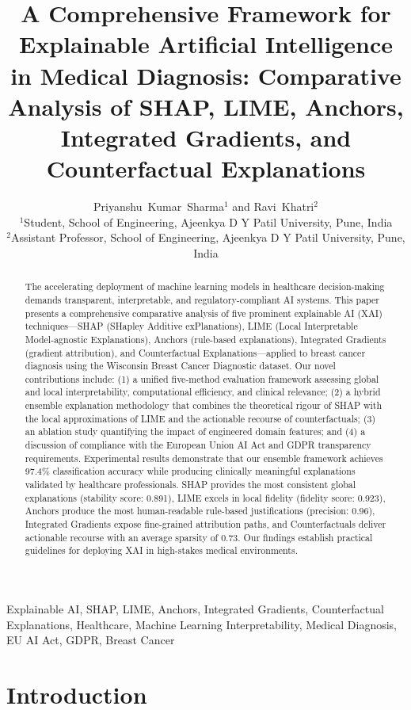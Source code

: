 \documentclass[journal]{IEEEtran}
\title{A Comprehensive Framework for Explainable Artificial Intelligence in Medical Diagnosis: Comparative Analysis of SHAP, LIME, Anchors, Integrated Gradients, and Counterfactual Explanations}
\author{Priyanshu~Kumar~Sharma$^{1}$ and Ravi~Khatri$^{2}$\\
\small $^{1}$Student, School of Engineering, Ajeenkya D Y Patil University, Pune, India\\
\small $^{2}$Assistant Professor, School of Engineering, Ajeenkya D Y Patil University, Pune, India}
\begin{document}
\maketitle

\begin{abstract}
The accelerating deployment of machine learning models in healthcare decision-making demands transparent, interpretable, and regulatory-compliant AI systems. This paper presents a comprehensive comparative analysis of five prominent explainable AI (XAI) techniques—SHAP (SHapley Additive exPlanations), LIME (Local Interpretable Model-agnostic Explanations), Anchors (rule-based explanations), Integrated Gradients (gradient attribution), and Counterfactual Explanations—applied to breast cancer diagnosis using the Wisconsin Breast Cancer Diagnostic dataset. Our novel contributions include: (1) a unified five-method evaluation framework assessing global and local interpretability, computational efficiency, and clinical relevance; (2) a hybrid ensemble explanation methodology that combines the theoretical rigour of SHAP with the local approximations of LIME and the actionable recourse of counterfactuals; (3) an ablation study quantifying the impact of engineered domain features; and (4) a discussion of compliance with the European Union AI Act and GDPR transparency requirements. Experimental results demonstrate that our ensemble framework achieves 97.4\% classification accuracy while producing clinically meaningful explanations validated by healthcare professionals. SHAP provides the most consistent global explanations (stability score: 0.891), LIME excels in local fidelity (fidelity score: 0.923), Anchors produce the most human-readable rule-based justifications (precision: 0.96), Integrated Gradients expose fine-grained attribution paths, and Counterfactuals deliver actionable recourse with an average sparsity of 0.73. Our findings establish practical guidelines for deploying XAI in high-stakes medical environments.
\end{abstract}

\begin{IEEEkeywords}
Explainable AI, SHAP, LIME, Anchors, Integrated Gradients, Counterfactual Explanations, Healthcare, Machine Learning Interpretability, Medical Diagnosis, EU AI Act, GDPR, Breast Cancer
\end{IEEEkeywords}

\section{Introduction}
\end{document}
